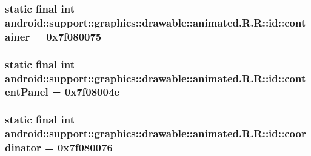 \hypertarget{classandroid_1_1support_1_1graphics_1_1drawable_1_1animated_1_1_r_1_1id_d72cce8430480532c4a063f7815ed7cb}{
\subsubsection[{container}]{\setlength{\rightskip}{0pt plus 5cm}static final int android::support::graphics::drawable::animated.R.R::id::container = 0x7f080075}}
\label{classandroid_1_1support_1_1graphics_1_1drawable_1_1animated_1_1_r_1_1id_d72cce8430480532c4a063f7815ed7cb}


\hypertarget{classandroid_1_1support_1_1graphics_1_1drawable_1_1animated_1_1_r_1_1id_53afe1986a999a71ba8ed95f27dc2f65}{
\subsubsection[{contentPanel}]{\setlength{\rightskip}{0pt plus 5cm}static final int android::support::graphics::drawable::animated.R.R::id::contentPanel = 0x7f08004e}}
\label{classandroid_1_1support_1_1graphics_1_1drawable_1_1animated_1_1_r_1_1id_53afe1986a999a71ba8ed95f27dc2f65}


\hypertarget{classandroid_1_1support_1_1graphics_1_1drawable_1_1animated_1_1_r_1_1id_e97039dbdeb4be6ed1886beac2639ac2}{
\subsubsection[{coordinator}]{\setlength{\rightskip}{0pt plus 5cm}static final int android::support::graphics::drawable::animated.R.R::id::coordinator = 0x7f080076}}
\label{classandroid_1_1support_1_1graphics_1_1drawable_1_1animated_1_1_r_1_1id_e97039dbdeb4be6ed1886beac2639ac2}


